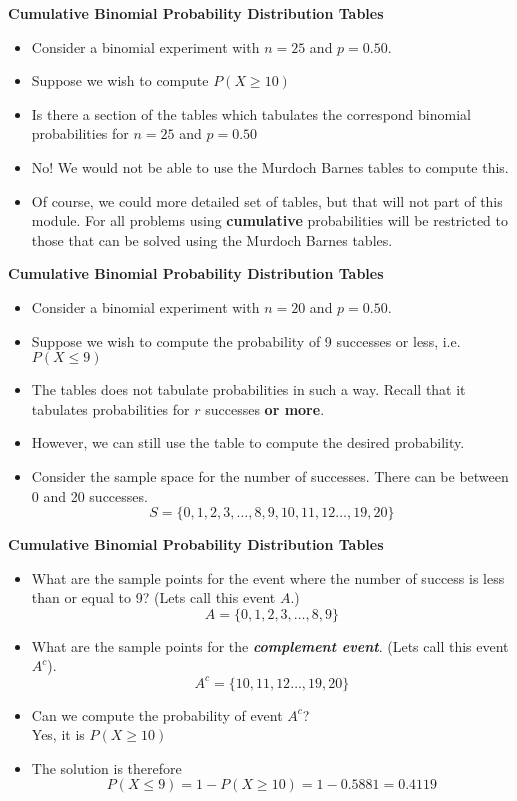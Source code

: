 \documentclass[a4]{beamer}
\begin{document}
{
\textbf{Cumulative Binomial Probability Distribution Tables}

\begin{itemize}
\item Consider a binomial experiment with $n = 25$ and $p = 0.50$.
\item Suppose we wish to compute $P(X \geq 10)$

\item Is there a section of the tables which tabulates the correspond binomial probabilities for $n = 25$ and $p = 0.50$

\item No! We would not be able to use the Murdoch Barnes tables to compute this.


\item Of course, we could more detailed set of tables, but that will not part of this module. For all problems using \textbf{cumulative} probabilities will be restricted to those that can be solved using the Murdoch Barnes tables.

\end{itemize}
}



{
\textbf{Cumulative Binomial Probability Distribution Tables}

\begin{itemize}
\item Consider a binomial experiment with $n = 20$ and $p = 0.50$.
\item Suppose we wish to compute the probability of 9 successes or less, i.e. $P(X \leq 9)$
\item The tables does not tabulate probabilities in such a way. Recall that it tabulates probabilities for $r$ successes \textbf{or more}.
\item However, we can still use the table to compute the desired probability.
\item Consider the sample space for the number of successes. There can be between 0 and 20 successes.
\Large
\[ S = \{0,1,2,3,\ldots,8,9,10,11,12 \ldots,19,20\}
\]
\end{itemize}
}
{
\textbf{Cumulative Binomial Probability Distribution Tables}

\begin{itemize}
\item What are the sample points for the event where the number of success is less than or equal to 9? (Lets call this event $A$.)
\[ A = \{0,1,2,3,\ldots,8,9\}
\]
\item What are the sample points for the \textbf{\emph{complement event}}. (Lets call this event $A^c$).
\[ A^c = \{10,11,12 \ldots,19,20\}
\]
\item Can we compute the probability of event $A^c$? \\ Yes, it is $P(X\geq 10)$
\item The solution is therefore \[P(X\leq 9) = 1- P(X \geq 10) = 1 - 0.5881 = 0.4119\]
\end{itemize}
}
\end{document}
